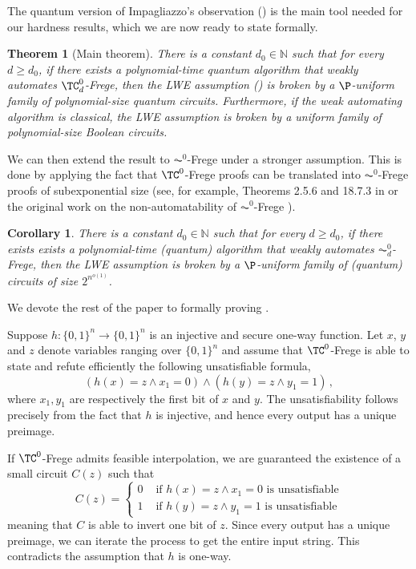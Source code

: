 \documentclass[11pt]{article}
\theoremstyle{definition}
\theoremstyle{plain}
\newtheorem{theorem}[definition]{Theorem}
\newtheorem{corollary}[definition]{Corollary}
\theoremstyle{remark}
\newcommand{\bN}{\mathbb{N}}
\begin{document}
The quantum version of Impagliazzo's observation () is the main tool needed for our hardness results, which we are now ready to state formally.


\begin{theorem}[Main theorem]
\label{thm:main}
    There is a constant $d_0 \in \bN$ such that for every $d \geq d_0$, if there exists a polynomial-time quantum algorithm that weakly automates $\TC^0_d$-Frege, then the LWE assumption () is broken by a $\P$-uniform family of polynomial-size quantum circuits. Furthermore, if the weak automating algorithm is classical, the LWE assumption is broken by a uniform family of polynomial-size Boolean circuits.
\end{theorem}


We can then extend the result to $\AC^0$-Frege under a stronger assumption. This is done by applying the fact that $\TC^0$-Frege proofs can be translated into $\AC^0$-Frege proofs of subexponential size (see, for example, Theorems 2.5.6 and 18.7.3 in \cite{krajicekBOOK} or the original work on the non-automatability of $\AC^0$-Frege \cite{BDGMP04}).

\begin{corollary}
\label{cor:main-AC0}
    There is a constant $d_0 \in \bN$ such that for every $d \geq d_0$, if there exists exists a polynomial-time (quantum) algorithm that weakly automates $\AC^0_d$-Frege, then the LWE assumption is broken by a $\P$-uniform family of (quantum) circuits of size $2^{n^{o(1)}}$.
\end{corollary}

We devote the rest of the paper to formally proving .

Suppose $h : \{0,1\}^n \to \{0,1\}^n$ is an injective and secure one-way function. Let $x$, $y$ and $z$ denote variables ranging over $\{0,1\}^n$ and assume that $\TC^0$-Frege is able to state and refute efficiently the following unsatisfiable formula,
\[ (h(x) = z \land x_1 = 0) \land (h(y) = z \land y_1 = 1)\,, \]
where $x_1, y_1$ are respectively the first bit of $x$ and $y$. The unsatisfiability follows precisely from the fact that $h$ is injective, and hence every output has a unique preimage.

If $\TC^0$-Frege admits feasible interpolation, we are guaranteed the existence of a small circuit $C(z)$ such that
\begin{equation*}
    C(z) = \begin{cases}
        0 &\text{ if } h(x) = z \land x_1 = 0 \text{ is unsatisfiable} \\
        1 &\text{ if } h(y) = z \land y_1 = 1 \text{ is unsatisfiable}
    \end{cases}
\end{equation*}
meaning that $C$ is able to invert one bit of $z$. Since every output has a unique preimage, we can iterate the process to get the entire input string. This contradicts the assumption that $h$ is one-way.
\end{document}
